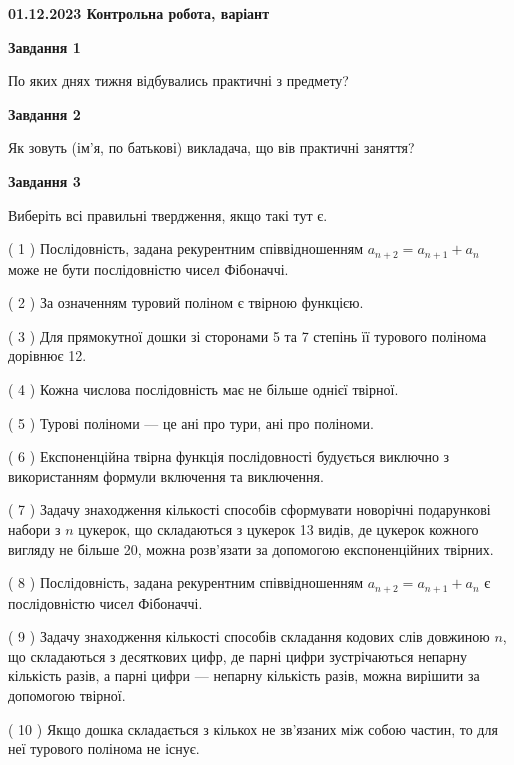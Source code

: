 \documentclass[12pt, ukrainian]{article}
\begin{document}
\begin {large}

\textbf{01.12.2023 Контрольна робота, варіант  }\par


{
{\begin {center}\textbf{Завдання 1}\end {center}}\par
По яких днях тижня відбувались практичні з предмету?\par
{\begin {center}\textbf{Завдання 2}\end {center}}\par
Як зовуть (ім'я, по батькові) викладача, що вів практичні заняття?\par
{\begin {center}\textbf{Завдання 3}\end {center}}\par
Виберіть всі правильні твердження, якщо такі тут є.\par
\vspace{2mm}
( 1 ) Послідовність, задана рекурентним співвідношенням $a_{n+2}=a_{n+1}+a_{n}$ може не бути послідовністю чисел Фібоначчі.%

( 2 ) За означенням туровий поліном є твірною функцією.%

( 3 ) Для прямокутної дошки зі сторонами 5 та 7 степінь її турового полінома дорівнює 12.%

( 4 ) Кожна числова послідовність має не більше однієї твірної.%

( 5 ) Турові поліноми --- це ані про тури, ані про поліноми.%

( 6 ) Експоненційна твірна функція послідовності будується виключно з використанням формули включення та виключення.%

( 7 ) Задачу знаходження кількості способів сформувати новорічні подарункові набори з $n$ цукерок, що складаються з цукерок 13 видів, де цукерок кожного вигляду не більше 20, можна розв’язати за допомогою експоненційних твірних.%

( 8 ) Послідовність, задана рекурентним співвідношенням $a_{n+2}=a_{n+1}+a_{n}$ є послідовністю чисел Фібоначчі.%

( 9 ) Задачу знаходження кількості способів складання кодових слів довжиною $n$, що складаються з десяткових цифр, де парні цифри зустрічаються непарну кількість разів, а парні цифри — непарну кількість разів, можна вирішити за допомогою твірної.%

( 10 ) Якщо дошка складається з кількох не зв’язаних між собою частин, то для неї турового полінома не існує.%
}
\end {large}

\vspace{4mm}
\newpage
\end{document}
